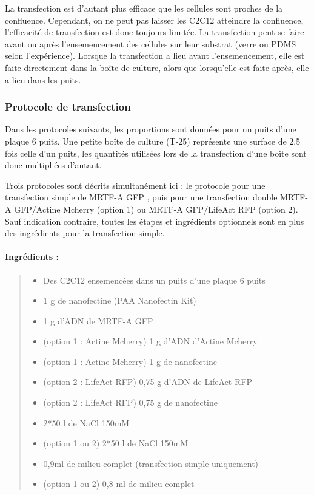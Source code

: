 	La transfection est d'autant plus efficace que les cellules sont proches de la confluence. Cependant, on ne peut pas laisser les C2C12 atteindre la confluence, l'efficacité de transfection est donc toujours limitée. La transfection peut se faire avant ou après l'ensemencement des cellules sur leur substrat (verre ou PDMS selon l'expérience). Lorsque la transfection a lieu avant l'ensemencement, elle est faite directement dans la boîte de culture, alors que lorsqu'elle est faite après, elle a lieu dans les puits. 
	
	 
	
	\subsubsection{Protocole de transfection}
	
	Dans les protocoles suivants, les proportions sont données pour un puits d'une plaque 6 puits. Une petite boîte de culture (T-25) représente une surface de 2,5 fois celle d'un puits, les quantités utilisées lors de la transfection d'une boîte sont donc multipliées d'autant.
	
	Trois protocoles sont décrits simultanément ici : le protocole pour une transfection simple de MRTF-A GFP , puis pour une transfection double MRTF-A GFP/Actine Mcherry (option 1) ou MRTF-A GFP/LifeAct RFP (option 2). Sauf indication contraire, toutes les étapes et ingrédients optionnels sont en plus des ingrédients pour la transfection simple.
	
\paragraph{Ingrédients :}
\begin{quote}

	\begin{itemize}
	\item Des C2C12 ensemencées dans un puits d'une plaque 6 puits
	\item 1 \micro g de nanofectine (PAA Nanofectin Kit)
	\item 1 \micro g d'ADN de MRTF-A GFP
	\item (option 1 : Actine Mcherry) 1 \micro g d'ADN d'Actine Mcherry
	\item (option 1 : Actine Mcherry) 1 \micro g de nanofectine
	\item (option 2 : LifeAct RFP) 0,75 \micro g d'ADN de LifeAct RFP
	\item (option 2 : LifeAct RFP) 0,75 \micro g de nanofectine
	\item 2*50 \micro l de NaCl 150mM
	\item (option 1 ou 2) 2*50 \micro l de NaCl 150mM
	\item 0,9ml de milieu complet (transfection simple uniquement)
	\item (option 1 ou 2) 0,8 ml de milieu complet
	\end{itemize}
\end{quote}

